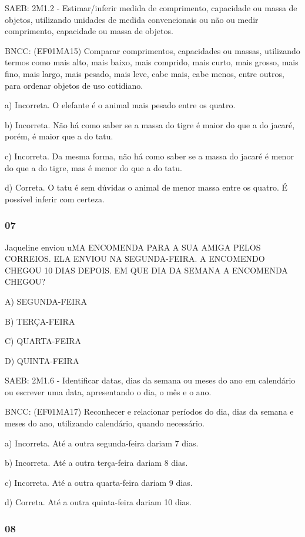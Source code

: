 SAEB: 2M1.2 - Estimar/inferir medida de comprimento, capacidade ou massa
de objetos, utilizando unidades de medida convencionais ou não ou medir
comprimento, capacidade ou massa de objetos.

BNCC: (EF01MA15) Comparar comprimentos, capacidades ou massas,
utilizando termos como mais alto, mais baixo, mais comprido, mais curto,
mais grosso, mais fino, mais largo, mais pesado, mais leve, cabe mais,
cabe menos, entre outros, para ordenar objetos de uso cotidiano.

a) Incorreta. O elefante é o animal mais pesado entre os quatro.

b) Incorreta. Não há como saber se a massa do tigre é maior do que a do
jacaré, porém, é maior que a do tatu.

c) Incorreta. Da mesma forma, não há como saber se a massa do jacaré é
menor do que a do tigre, mas é menor do que a do tatu.

d) Correta. O tatu é sem dúvidas o animal de menor massa entre os
quatro. É possível inferir com certeza.

\subsubsection{07 }\label{section-123}

Jaqueline enviou uMA ENCOMENDA PARA A SUA AMIGA PELOS CORREIOS. ELA
ENVIOU NA SEGUNDA-FEIRA. A ENCOMENDO CHEGOU 10 DIAS DEPOIS. EM QUE DIA
DA SEMANA A ENCOMENDA CHEGOU?

A) SEGUNDA-FEIRA

B) TERÇA-FEIRA

C) QUARTA-FEIRA

D) QUINTA-FEIRA

SAEB: 2M1.6 - Identificar datas, dias da semana ou meses do ano em
calendário ou escrever uma data, apresentando o dia, o mês e o ano.

BNCC: (EF01MA17) Reconhecer e relacionar períodos do dia, dias da semana
e meses do ano, utilizando calendário, quando necessário.

a) Incorreta. Até a outra segunda-feira dariam 7 dias.

b) Incorreta. Até a outra terça-feira dariam 8 dias.

c) Incorreta. Até a outra quarta-feira dariam 9 dias.

d) Correta. Até a outra quinta-feira dariam 10 dias.

\subsubsection{08 }\label{section-124}

